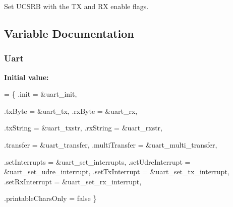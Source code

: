 Set U\-C\-S\-R\-B with the T\-X and R\-X enable flags. 



\subsection{Variable Documentation}
\hypertarget{a00016_aedc3c4ab9d8b22838e2796525ae2e707}{
\subsubsection[{Uart}]{ {\bf Uart}\hspace{0.3cm}{\ttfamily [static]}}}\label{a00016_aedc3c4ab9d8b22838e2796525ae2e707}
{\bfseries Initial value\-:}
\begin{DoxyCode}
= \{
  .init = &uart\_init,
  
  .txByte = &uart\_tx,
  .rxByte = &uart\_rx,
  
  .txString = &uart\_txstr,
  .rxString = &uart\_rxstr,

  .transfer = &uart\_transfer,
  .multiTransfer = &uart\_multi\_transfer,
  
  .setInterrupts = &uart\_set\_interrupts,
  .setUdreInterrupt = &uart\_set\_udre\_interrupt,
  .setTxInterrupt = &uart\_set\_tx\_interrupt,
  .setRxInterrupt = &uart\_set\_rx\_interrupt,
  
  .printableCharsOnly = \textcolor{keyword}{false}
\}
\end{DoxyCode}
